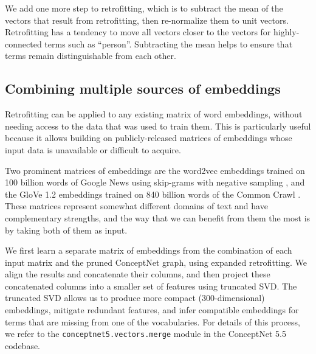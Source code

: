 \documentclass[letterpaper]{article}
\begin{document}
We add one more step to retrofitting, which is to subtract the mean of the
vectors that result from retrofitting, then re-normalize them to unit vectors.
Retrofitting has a tendency to move all vectors closer to the vectors for
highly-connected terms such as ``person''. Subtracting the mean helps to ensure
that terms remain distinguishable from each other.

\subsection{Combining multiple sources of embeddings}

Retrofitting can be applied to any existing matrix of word embeddings, without
needing access to the data that was used to train them. This is particularly
useful because it allows building on publicly-released matrices of embeddings
whose input data is unavailable or difficult to acquire.

Two prominent matrices of embeddings are the word2vec embeddings trained on 100
billion words of Google News using skip-grams with negative sampling
\cite{mikolov2013word2vec}, and the GloVe 1.2 embeddings trained on 840 billion
words of the Common Crawl \cite{pennington2014glove}. These matrices represent
somewhat different domains of text and have complementary strengths, and the
way that we can benefit from them the most is by taking both of them as input.

We first learn a separate matrix of embeddings from the combination of each
input matrix and the pruned ConceptNet graph, using expanded retrofitting. We
align the results and concatenate their columns, and then project these
concatenated columns into a smaller set of features using truncated SVD. The
truncated SVD allows us to produce more compact (300-dimensional) embeddings,
mitigate redundant features, and infer compatible embeddings for terms that
are missing from one of the vocabularies. For details of this process, we
refer to the \texttt{conceptnet5.vectors.merge} module in the ConceptNet 5.5
codebase.


\end{document}
